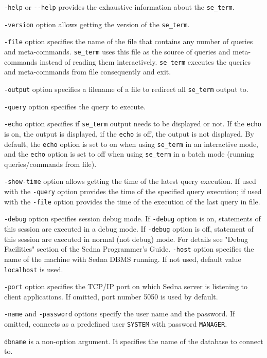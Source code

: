 \documentclass[a4paper,12pt]{article}
\begin{document}
\verb!-help! or \verb!--help! provides the exhaustive information about the \verb!se_term!.

\verb!-version! option allows getting the version of the \verb!se_term!.

\verb!-file! option specifies the name of the file that contains any number of queries and meta-commands. \verb!se_term! uses this file as the source of queries and meta-commands instead of reading them interactively. \verb!se_term! executes the queries and meta-commands from file consequently and exit.

\verb!-output! option specifies a filename of a file to redirect all \verb!se_term! output to. 

\verb!-query! option specifies the query to execute.

\verb!-echo! option specifies if \verb!se_term! output needs to be displayed or not. If the \verb!echo! is on, the output is displayed, if the \verb!echo! is off, the output is not displayed. By default, the \verb!echo! option is set to on when using \verb!se_term! in an interactive mode, and the \verb!echo! option is set to off when using \verb!se_term! in a batch mode (running queries/commands from file).

\verb!-show-time! option allows getting the time of the latest query execution. If used with the \verb!-query! option provides the time of the specified query execution; if used with the \verb!-file! option provides the time of the execution of the last query in file.

\verb!-debug! option specifies session debug mode. If \verb!-debug! option is on, statements of this session are executed in a debug mode. If \verb!-debug! option is off, statement of this session are executed in normal (not debug) mode. For details see "Debug Facilities" section of the Sedna Programmer's Guide.
\verb!-host! option specifies the name of the machine with Sedna DBMS running. If not used, default value \verb!localhost! is used.

\verb!-port! option specifies the TCP/IP port on which Sedna server is listening to client applications. If omitted, port number 5050 is used by default.

\verb!-name! and \verb!-password! options specify the user name and the password. If omitted, connects as a predefined user \verb!SYSTEM! with password \verb!MANAGER!.

\verb!dbname! is a non-option argument. It specifies the name of the database to connect to.
\end{document}

